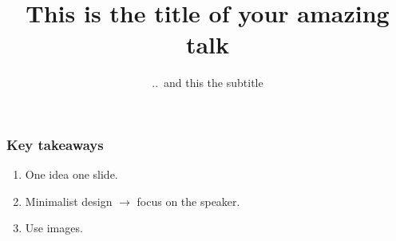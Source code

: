 \documentclass{beamer}
\title{This is the title of your amazing talk}
\subtitle{..\ and this the subtitle}
\begin{document}
\begin{frame}
    \titlepage
\end{frame}





\begin{miframe}
    \frametitle{Key takeaways}
    \begin{enumerate}
        \item One idea one slide.
        \item Minimalist design $\to$ focus on the speaker.
        \item Use images.
    \end{enumerate}
\end{miframe}
\end{document}
